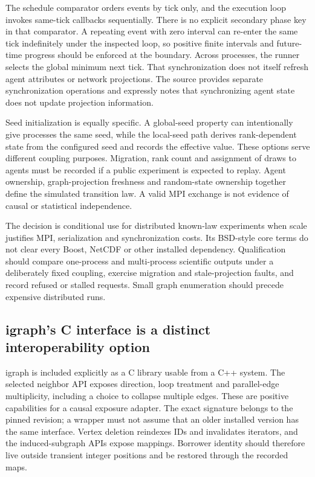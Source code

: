 The schedule comparator orders events by tick only, and the execution loop invokes same-tick callbacks sequentially. There is no explicit secondary phase key in that comparator. A repeating event with zero interval can re-enter the same tick indefinitely under the inspected loop, so positive finite intervals and future-time progress should be enforced at the boundary. Across processes, the runner selects the global minimum next tick. That synchronization does not itself refresh agent attributes or network projections. The source provides separate synchronization operations and expressly notes that synchronizing agent state does not update projection information.~\citep{exec25_cnet_repast}

Seed initialization is equally specific. A global-seed property can intentionally give processes the same seed, while the local-seed path derives rank-dependent state from the configured seed and records the effective value. These options serve different coupling purposes. Migration, rank count and assignment of draws to agents must be recorded if a public experiment is expected to replay. Agent ownership, graph-projection freshness and random-state ownership together define the simulated transition law. A valid MPI exchange is not evidence of causal or statistical independence.~\citep{exec25_cnet_repast,exec25_cnet_choice}

The decision is conditional use for distributed known-law experiments when scale justifies MPI, serialization and synchronization costs. Its BSD-style core terms do not clear every Boost, NetCDF or other installed dependency. Qualification should compare one-process and multi-process scientific outputs under a deliberately fixed coupling, exercise migration and stale-projection faults, and record refused or stalled requests. Small graph enumeration should precede expensive distributed runs.~\citep{exec25_cnet_repast,exec25_cnet_choice}

\subsection{igraph's C interface is a distinct interoperability option}

igraph is included explicitly as a C library usable from a C++ system. The selected neighbor API exposes direction, loop treatment and parallel-edge multiplicity, including a choice to collapse multiple edges. These are positive capabilities for a causal exposure adapter. The exact signature belongs to the pinned revision; a wrapper must not assume that an older installed version has the same interface. Vertex deletion reindexes IDs and invalidates iterators, and the induced-subgraph APIs expose mappings. Borrower identity should therefore live outside transient integer positions and be restored through the recorded maps.~\citep{exec25_cnet_igraph}


